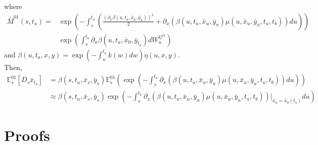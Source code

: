 \documentclass[a4paper,10pt]{article}
\newcommand{\1}{\mathbf{1}}
\begin{document}
where
\begin{align*}
\bar{M}^{01}(s,t_a) = &\exp\left(-\int_{s}^{t_a} \left(\frac{\left(\partial_x \beta(u,t_a,\bar{x}_u,\bar{y}_{u})\right)^{2}}{2} + \partial_x (\beta(u,t_a,\bar{x}_u,\bar{y}_{u}) \mu(u,\bar{x}_u,\bar{y}_u,t_a,t_b)) du \right)\right) \\
&\exp\left(\int_{s}^{t_a} \partial_x \beta(u,t_a,\bar{x}_0,\bar{y}_{t_a}) dW^{\mathbb{Q}^{01}}_u \right)
\end{align*}
and $\beta(u,t_a,x,y) = \exp\left(-\int_{u}^{t_a}k(w)dw\right)\eta(u,x,y)$.\\
Then, 
\begin{align}\label{approximation_E_01_Ds_x_t}
\mathbb{E}^{01}_s\left[D_s \bar{x}_{t_a}\right] &= \beta(s,t_a,\bar{x}_s,\bar{y}_s)  \mathbb{E}_s^{01}\left(\exp\left(-\int_{s}^{t_a}\partial_x (\beta(u,t_a,\bar{x}_u,\bar{y}_u) \mu(u,\bar{x}_u, \bar{y}_u,t_a,t_b)) du \right)\right) \nonumber \\
&\approx \beta(s,t_a,\bar{x}_s,\bar{y}_s) \exp\left(-\int_{s}^{t_a}\partial_x (\beta(u,t_a,\bar{x}_u,\bar{y}_u) \mu(u,\bar{x}_u, \bar{y}_u,t_a,t_b))|_{\bar{x}_u=\bar{x}_{0}(t_a)}  du \right)
\end{align}

\section{Proofs}
\end{document}
